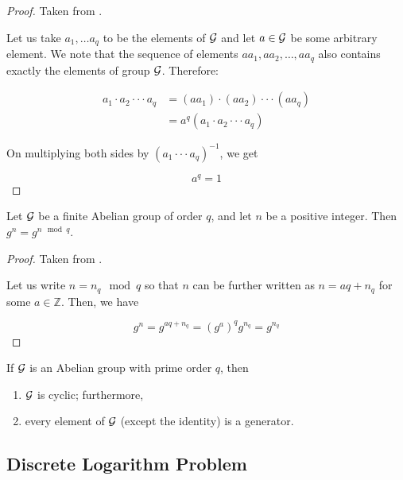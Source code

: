 \begin{proof}

Taken from \cite{koocmsc}.

Let us take $ a_1, \ldots a_q $ to be the elements of $\mathcal{G}$ and let $ a \in \mathcal{G} $ be some arbitrary element. We note that the sequence of elements $ aa_1, aa_2, \ldots , aa_q $ also contains exactly the elements of group $ \mathcal{G} $. Therefore:

\begin{equation*}
\begin{split}
a_1 \cdot a_2 \cdot \cdot \cdot a_q
&= (aa_1) \cdot (aa_2) \cdot \cdot \cdot (aa_q)\\
&= a^q (a_1 \cdot a_2 \cdot \cdot \cdot a_q)
\end{split}
\end{equation*}

On multiplying both sides by $ (a_1 \cdot \cdot \cdot a_q)^{-1} $, we get 

\begin{equation*}
a^q = 1
\end{equation*}
\end{proof}

\begin{corollary}
Let $ \mathcal{G} $ be a finite Abelian group of order $ q $, and let $ n $ be a positive integer.
Then $ g^n = g^{n \mod q} $.
\end{corollary}

\begin{proof}

Taken from \cite{koocmsc}.

Let us write $ n = n_q \mod q $ so that $ n $ can be further written as $ n = aq + n_q $ for some $ a \in \mathbb{Z} $. Then, we have

\begin{equation*}
g^n = g^{aq+n_q} = (g^a)^q g^{n_q} = g^{n_q}
\end{equation*}
\end{proof}

\begin{lemma}
If $ \mathcal{G} $ is an Abelian group with prime order $ q $, then 
\begin{enumerate}
    \item $ \mathcal{G} $ is cyclic; furthermore,
    \item every element of $ \mathcal{G} $ (except the identity) is a generator.
\end{enumerate}
\end{lemma}

\subsection{Discrete Logarithm Problem}

